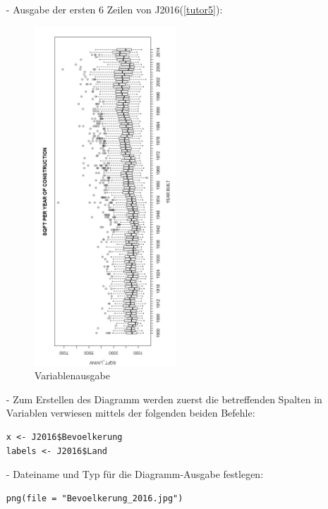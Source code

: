 \begin{itemize}
\item[-]Ausgabe der ersten 6 Zeilen von J2016(\autoref{tutor5}):
\begin{figure}[!htb]
        \begin{minipage}{1\textwidth}
                \centering
                \includegraphics[width=0.50\textwidth]{pics/tutor5.png}\par\vspace{0cm}
                \caption{Variablenausgabe}
                \label{fig:tutor5}
        \end{minipage}
\end{figure}
\item[-]Zum Erstellen des Diagramm werden zuerst die betreffenden Spalten in Variablen verwiesen mittels der folgenden beiden Befehle:
\begin{lstlisting}
x <- J2016$Bevoelkerung
labels <- J2016$Land
\end{lstlisting}
\item[-]Dateiname und Typ für die Diagramm-Ausgabe festlegen:
\begin{lstlisting}
png(file = "Bevoelkerung_2016.jpg")

\end{lstlisting}
\end{itemize}
